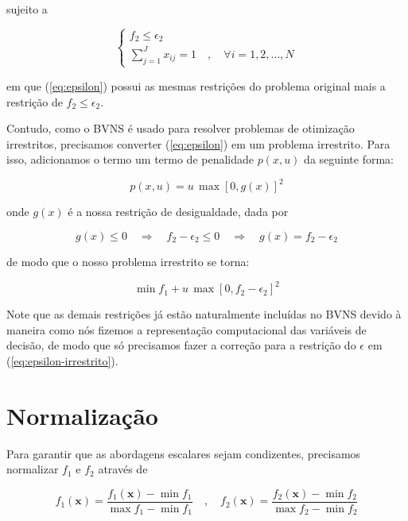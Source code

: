 \documentclass[
	12pt,				%
	oneside,			%
	a4paper,			%
	chapter=TITLE,
	sumario=tradicional,
	english,			%
	brazil				%
]{abntex2}
\begin{document}
\noindent sujeito a 

\begin{equation} \label{eq:rest-epsilon}
    \begin{cases}
      f_2 \leq \epsilon_2 \\
      \sum_{j=1}^{J} x_{ij} = 1 \quad , \quad \forall i = {1, 2, ..., N}
    \end{cases}       
\end{equation}

\noindent em que (\ref{eq:epsilon}) possui as mesmas restrições do problema original
mais a restrição de $f_2 \leq \epsilon_2$.

Contudo, como o BVNS é usado para resolver problemas de otimização irrestritos, 
precisamos converter (\ref{eq:epsilon}) em um problema irrestrito. Para isso, adicionamos o 
termo um termo de penalidade $p(x, u)$ da seguinte forma:

\[ p(x, u) = u \, \max \left[ 0, g(x) \right] ^2 \]

\noindent onde $g(x)$ é a nossa restrição de desigualdade, dada por 

\[ g(x) \leq 0 \quad \Longrightarrow \quad f_2 - \epsilon_2 \leq 0 \quad \Longrightarrow \quad g(x) = f_2 - \epsilon_2 \]

\noindent de modo que o nosso problema irrestrito se torna:  


\begin{equation}\label{eq:epsilon-irrestrito}
	\min f_1 + u \, \max \left[ 0, f_2 - \epsilon_2 \right] ^2
\end{equation}

Note que as demais restrições já estão naturalmente incluídas no BVNS devido 
à maneira como nós fizemos a representação computacional das variáveis de decisão, 
de modo que só precisamos fazer a correção para a restrição do $\epsilon$
em (\ref{eq:epsilon-irrestrito}).



\section{Normalização}

Para garantir que as abordagens escalares sejam condizentes, precisamos normalizar $f_1$ e $f_2$ 
através de 

\begin{equation} \label{eq:normalizacao}
	f_1(\mathbf{x}) = \frac{f_1(\mathbf{x}) - \min f_1}{\max f_1 - \min f_1}
	\quad , \quad 
	f_2(\mathbf{x}) = \frac{f_2(\mathbf{x}) - \min f_2}{\max f_2 - \min f_2}       
\end{equation}
\end{document}

